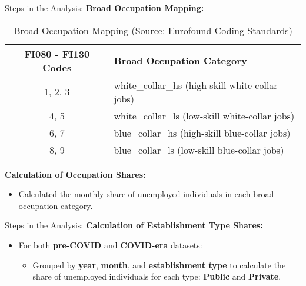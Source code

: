 \documentclass[
	11pt, %
]{beamer}
\begin{document}
\begin{frame}{Steps in the Analysis:}
    \textbf{Broad Occupation Mapping:}
    \begin{table}[]
        \centering
        \begin{tabular}{|c|l|}
            \hline
            \textbf{FI080 - FI130 Codes} & \textbf{Broad Occupation Category} \\ \hline
            1, 2, 3             & white\_collar\_hs (high-skill white-collar jobs) \\ \hline
            4, 5                & white\_collar\_ls (low-skill white-collar jobs) \\ \hline
            6, 7                & blue\_collar\_hs (high-skill blue-collar jobs) \\ \hline
            8, 9                & blue\_collar\_ls (low-skill blue-collar jobs) \\ \hline
        \end{tabular}
        \caption{Broad Occupation Mapping (Source: \href{https://www.eurofound.europa.eu/en/coding-and-classification-standards-0}{Eurofound Coding Standards})}
        \label{tab:occupation_mapping}
    \end{table}

    \textbf{Calculation of Occupation Shares:}
    \begin{itemize}
        \item Calculated the monthly share of unemployed individuals in each broad occupation category.
    \end{itemize}
\end{frame}

\begin{frame}{Steps in the Analysis:}
    \textbf{Calculation of Establishment Type Shares:}
    \begin{itemize}
        \item For both \textbf{pre-COVID} and \textbf{COVID-era} datasets:
        \begin{itemize}
            \item Grouped by \textbf{year}, \textbf{month}, and \textbf{establishment type} to calculate the share of unemployed individuals for each type: \textbf{Public} and \textbf{Private}.
        \end{itemize}
    \end{itemize}
\end{frame}
\end{document}
